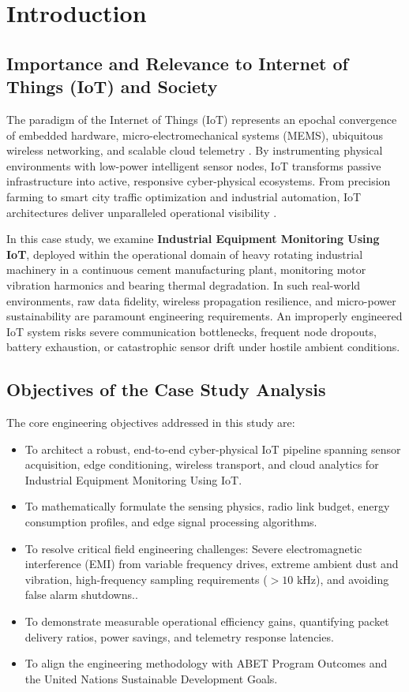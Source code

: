 \section{Introduction}

\subsection{Importance and Relevance to Internet of Things (IoT) and Society}
The paradigm of the Internet of Things (IoT) represents an epochal convergence of embedded hardware, micro-electromechanical systems (MEMS), ubiquitous wireless networking, and scalable cloud telemetry \cite{al2015internet}. By instrumenting physical environments with low-power intelligent sensor nodes, IoT transforms passive infrastructure into active, responsive cyber-physical ecosystems. From precision farming to smart city traffic optimization and industrial automation, IoT architectures deliver unparalleled operational visibility \cite{zanella2014internet}.

In this case study, we examine \textbf{Industrial Equipment Monitoring Using IoT}, deployed within the operational domain of heavy rotating industrial machinery in a continuous cement manufacturing plant, monitoring motor vibration harmonics and bearing thermal degradation. In such real-world environments, raw data fidelity, wireless propagation resilience, and micro-power sustainability are paramount engineering requirements. An improperly engineered IoT system risks severe communication bottlenecks, frequent node dropouts, battery exhaustion, or catastrophic sensor drift under hostile ambient conditions.

\subsection{Objectives of the Case Study Analysis}
The core engineering objectives addressed in this study are:
\begin{itemize}
  \item To architect a robust, end-to-end cyber-physical IoT pipeline spanning sensor acquisition, edge conditioning, wireless transport, and cloud analytics for Industrial Equipment Monitoring Using IoT.
  \item To mathematically formulate the sensing physics, radio link budget, energy consumption profiles, and edge signal processing algorithms.
  \item To resolve critical field engineering challenges: Severe electromagnetic interference (EMI) from variable frequency drives, extreme ambient dust and vibration, high-frequency sampling requirements ($>10\text{ kHz}$), and avoiding false alarm shutdowns..
  \item To demonstrate measurable operational efficiency gains, quantifying packet delivery ratios, power savings, and telemetry response latencies.
  \item To align the engineering methodology with ABET Program Outcomes and the United Nations Sustainable Development Goals.
\end{itemize}

